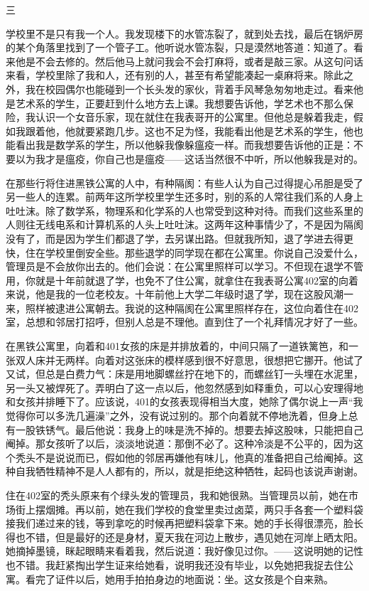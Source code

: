 三 

学校里不是只有我一个人。我发现楼下的水管冻裂了，就到处去找，最后在锅炉房的某个角落里找到了一个管子工。他听说水管冻裂，只是漠然地答道：知道了。看来他是不会去修的。然后他马上就问我会不会打麻将，或者是敲三家。从这句问话来看，学校里除了我和人，还有别的人，甚至有希望能凑起一桌麻将来。除此之外，我在校园偶尔也能碰到一个长头发的家伙，背着手风琴急匆匆地走过。看来他是艺术系的学生，正要赶到什么地方去上课。我想要告诉他，学艺术也不那么保险，我认识一个女音乐家，现在就住在我表哥开的公寓里。但他总是躲着我走，假如我跟着他，他就要紧跑几步。这也不足为怪，我能看出他是艺术系的学生，他也能看出我是数学系的学生，所以他躲我像躲瘟疫一样。而我想要告诉他的正是：不要以为我才是瘟疫，你自己也是瘟疫——这话当然很不中听，所以他躲我是对的。 

在那些行将住进黑铁公寓的人中，有种隔阂：有些人认为自己过得提心吊胆是受了另一些人的连累。前两年这所学校里学生还多时，别的系的人常往我们系的人身上吐吐沫。除了数学系，物理系和化学系的人也常受到这种对待。而我们这些系里的人则往无线电系和计算机系的人头上吐吐沫。这两年这种事情少了，不是因为隔阂没有了，而是因为学生们都退了学，去另谋出路。但就我所知，退了学进去得更快，住在学校里倒安全些。那些退学的同学现在都在公寓里。你说自己没爱什么，管理员是不会放你出去的。他们会说：在公寓里照样可以学习。不但现在退学不管用，你就是十年前就退了学，也免不了住公寓，就拿住在我表哥公寓402室的向着来说，他是我的一位老校友。十年前他上大学二年级时退了学，现在这股风潮一来，照样被逮进公寓朝去。我说的这种隔阂在公寓里照样存在，这位向着住在402室，总想和邻居打招呼，但别人总是不理他。直到住了一个礼拜情况才好了一些。 

在黑铁公寓里，向着和401女孩的床是并排放着的，中间只隔了一道铁篱笆，和一张双人床并无两样。向着对这张床的模样感到很不好意思，很想把它挪开。他试了又试，但总是白费力气：床是用地脚螺丝拧在地下的，而螺丝钉一头埋在水泥里，另一头又被焊死了。弄明白了这一点以后，他忽然感到如释重负，可以心安理得地和女孩并排睡下了。应该说，401的女孩表现得相当大度，她除了偶尔说上一声“我觉得你可以多洗几遍澡”之外，没有说过别的。那个向着就不停地洗着，但身上总有一股铁锈气。最后他说：我身上的味是洗不掉的。想要去掉这股味，只能把自己阉掉。那女孩听了以后，淡淡地说道：那倒不必了。这种冷淡是不公平的，因为这个秃头不是说说而已，假如他的邻居再嫌他有味儿，他真的准备把自己给阉掉。这种自我牺牲精神不是人人都有的，所以，就是拒绝这种牺牲，起码也该说声谢谢。 

住在402室的秃头原来有个绿头发的管理员，我和她很熟。当管理员以前，她在市场街上摆烟摊。再以前，她在我们学校的食堂里卖过卤菜，两只手各套一个塑料袋接我们递过来的钱，等到拿吃的时候再把塑料袋拿下来。她的手长得很漂亮，脸长得也不错，但是最好的还是身材，夏天我在河边上散步，遇见她在河岸上晒太阳。她摘掉墨镜，眯起眼睛来看着我，然后说道：我好像见过你。——这说明她的记性也不错。我赶紧掏出学生证来给她看，说明我还没有毕业，以免她把我捉去住公寓。看完了证件以后，她用手拍拍身边的地面说：坐。这女孩是个自来熟。 

